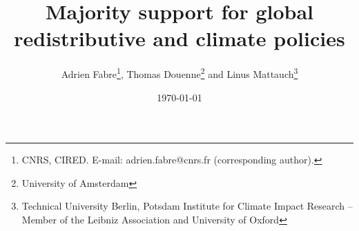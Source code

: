 % 


\title{Majority support for global redistributive and climate policies
} 

\author{Adrien Fabre\footnote{CNRS, CIRED. E-mail: adrien.fabre@cnrs.fr (corresponding author).}, Thomas Douenne\footnote{University of Amsterdam}\; and Linus Mattauch\footnote{Technical University Berlin, Potsdam Institute for Climate Impact Research -- Member of the Leibniz Association and University of Oxford}
} %

\date{\today} %



\maketitle

